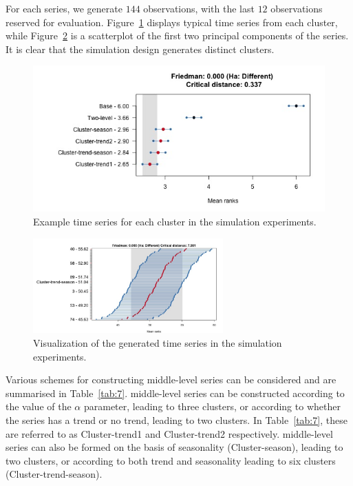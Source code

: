 \documentclass[a4paper,review,12pt,authoryear]{elsarticle}
\begin{document}
For each series, we generate $144$ observations, with the last $12$ observations reserved for evaluation. Figure~\ref{fig:simu_emps} displays typical time series from each cluster, while Figure~\ref{fig:simu_pca} is a scatterplot of the first two principal components of the series. It is clear that the simulation design generates distinct clusters.

\begin{figure}[h!]
\centering
\includegraphics[width=\textwidth]{../figures/Figure10.jpg}
\caption{\label{fig:simu_emps}Example time series for each cluster in the simulation experiments.}
\end{figure}

\begin{figure}[h!]
    \centering
    \includegraphics[width=0.65\textwidth]{../figures/Figure11.jpg}
    \caption{\label{fig:simu_pca}Visualization of the generated time series in the simulation experiments.}
\end{figure}






Various schemes for constructing middle-level series can be considered and are summarised in Table~\ref{tab:7}. middle-level series can be constructed according to the value of the $\alpha$ parameter, leading to three clusters, or according to whether the series has a trend or no trend, leading to two clusters. In Table~\ref{tab:7}, these are referred to as Cluster-trend1 and Cluster-trend2 respectively. middle-level series can also be formed on the basis of seasonality (Cluster-season), leading to two clusters, or according to both trend and seasonality leading to six clusters (Cluster-trend-season).
\end{document}
